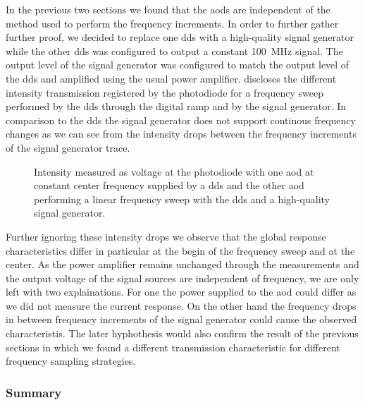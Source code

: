 In the previous two sections we found that the \gls{aod}s are independent of
the method used to perform the frequency increments. In order to further
gather further proof, we decided to replace one
\gls{dds} with a high-quality signal generator while the other \gls{dds} was
configured to output a constant \SI{100}{\mega\hertz} signal. The output
level of the signal generator was configured to match the output level of
the \gls{dds} and amplified using the usual power amplifier.
 discloses the different
intensity transmission registered by the photodiode for a frequency sweep
performed by the \gls{dds} through the digital ramp and by the signal
generator. In comparison to the \gls{dds} the signal generator does not
support continous frequency changes as we can see from the intensity drops
between the frequency increments of the signal generator trace.
\begin{figure}[htb]
  \centering
  \begin{adjustbox}{width=\textwidth}
  \end{adjustbox}
  \caption{Intensity measured as voltage at the photodiode with one \gls{aod}
    at constant center frequency supplied by a \gls{dds} and the other
    \gls{aod} performing a linear frequency sweep with the \gls{dds} and a
    high-quality signal generator.
  }\label{fig:intensity_distribution_signal_sources}
\end{figure}
Further ignoring these intensity drops we observe that the global response
characteristics differ in particular at the begin of the frequency sweep and
at the center. As the power amplifier remains unchanged through the
measurements and the output voltage of the signal sources are independent of
frequency, we are only left with two explainations. For one the power supplied
to the \gls{aod} could differ as we did not measure the current response. On
the other hand the frequency drops in between frequency increments of the
signal generator could cause the observed characteristis. The later
hyphothesis would also confirm the result of the previous sections in which we
found a different transmission characteristic for different frequency
sampling strategies.

\subsubsection{Summary}

